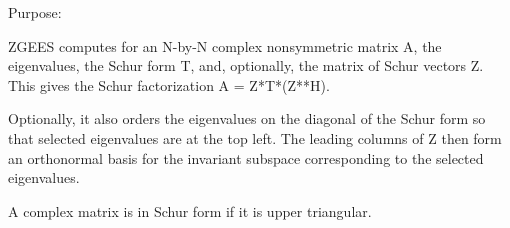  \begin{DoxyParagraph}{Purpose\+: }
\begin{DoxyVerb} ZGEES computes for an N-by-N complex nonsymmetric matrix A, the
 eigenvalues, the Schur form T, and, optionally, the matrix of Schur
 vectors Z.  This gives the Schur factorization A = Z*T*(Z**H).

 Optionally, it also orders the eigenvalues on the diagonal of the
 Schur form so that selected eigenvalues are at the top left.
 The leading columns of Z then form an orthonormal basis for the
 invariant subspace corresponding to the selected eigenvalues.

 A complex matrix is in Schur form if it is upper triangular.\end{DoxyVerb}
 
\end{DoxyParagraph}

